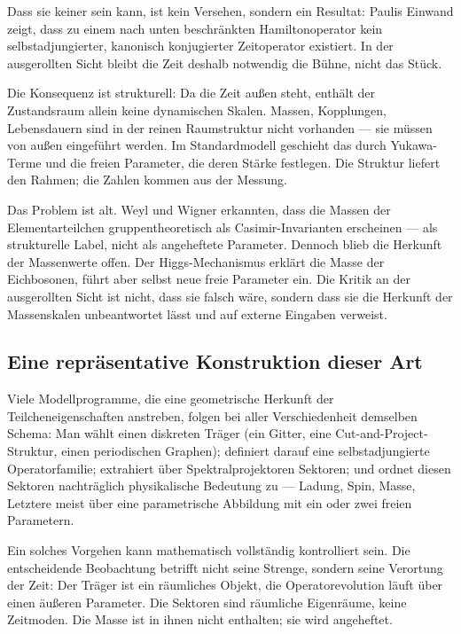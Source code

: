 Dass sie keiner sein kann, ist kein Versehen, sondern ein Resultat:
Paulis Einwand zeigt, dass zu einem nach unten beschränkten
Hamiltonoperator kein selbstadjungierter, kanonisch konjugierter
Zeitoperator existiert. In der ausgerollten Sicht bleibt die
Zeit deshalb notwendig die Bühne, nicht das Stück.

Die Konsequenz ist strukturell: Da die Zeit außen steht, enthält der
Zustandsraum allein keine dynamischen Skalen. Massen, Kopplungen,
Lebensdauern sind in der reinen Raumstruktur nicht vorhanden --- sie
müssen von außen eingeführt werden. Im Standardmodell geschieht das
durch Yukawa-Terme und die freien Parameter, die deren Stärke
festlegen. Die Struktur liefert den Rahmen; die Zahlen kommen aus der
Messung.

Das Problem ist alt. Weyl und Wigner erkannten, dass die Massen der
Elementarteilchen gruppentheoretisch als Casimir-Invarianten erscheinen
--- als strukturelle Label, nicht als angeheftete Parameter. Dennoch
blieb die Herkunft der Massenwerte offen. Der Higgs-Mechanismus erklärt
die Masse der Eichbosonen, führt aber selbst neue freie Parameter ein.
Die Kritik an der ausgerollten Sicht ist nicht, dass sie falsch wäre,
sondern dass sie die Herkunft der Massenskalen unbeantwortet lässt und
auf externe Eingaben verweist.

\subsection*{Eine repräsentative Konstruktion dieser Art}

Viele Modellprogramme, die eine geometrische Herkunft der
Teilcheneigenschaften anstreben, folgen bei aller Verschiedenheit
demselben Schema: Man wählt einen diskreten Träger (ein Gitter, eine
Cut-and-Project-Struktur, einen periodischen Graphen); definiert darauf
eine selbstadjungierte Operatorfamilie; extrahiert über
Spektralprojektoren Sektoren; und ordnet diesen Sektoren nachträglich
physikalische Bedeutung zu --- Ladung, Spin, Masse, Letztere meist über
eine parametrische Abbildung mit ein oder zwei freien Parametern.

Ein solches Vorgehen kann mathematisch vollständig kontrolliert sein.
Die entscheidende Beobachtung betrifft nicht seine Strenge, sondern
seine Verortung der Zeit: Der Träger ist ein räumliches Objekt, die
Operatorevolution läuft über einen äußeren Parameter. Die Sektoren sind
räumliche Eigenräume, keine Zeitmoden. Die Masse ist in ihnen nicht
enthalten; sie wird angeheftet.

